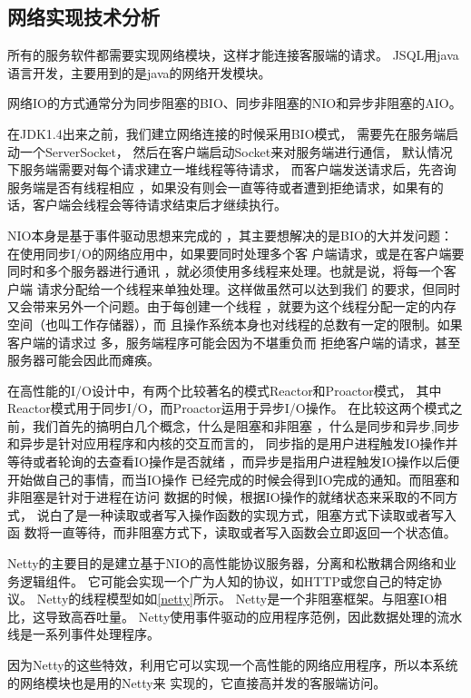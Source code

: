 \subsection{网络实现技术分析}
所有的服务软件都需要实现网络模块，这样才能连接客服端的请求。
JSQL用java语言开发，主要用到的是java的网络开发模块。

网络IO的方式通常分为同步阻塞的BIO、同步非阻塞的NIO和异步非阻塞的AIO。

在JDK1.4出来之前，我们建立网络连接的时候采用BIO模式，
需要先在服务端启动一个ServerSocket，
然后在客户端启动Socket来对服务端进行通信，
默认情况下服务端需要对每个请求建立一堆线程等待请求，
而客户端发送请求后，先咨询服务端是否有线程相应
，如果没有则会一直等待或者遭到拒绝请求，如果有的话，客户端会线程会等待请求结束后才继续执行。

NIO本身是基于事件驱动思想来完成的
，其主要想解决的是BIO的大并发问题：
 在使用同步I/O的网络应用中，如果要同时处理多个客
 户端请求，或是在客户端要同时和多个服务器进行通讯
 ，就必须使用多线程来处理。也就是说，将每一个客户端
 请求分配给一个线程来单独处理。这样做虽然可以达到我们
 的要求，但同时又会带来另外一个问题。由于每创建一个线程
 ，就要为这个线程分配一定的内存空间（也叫工作存储器），而
 且操作系统本身也对线程的总数有一定的限制。如果客户端的请求过
 多，服务端程序可能会因为不堪重负而
 拒绝客户端的请求，甚至服务器可能会因此而瘫痪。

在高性能的I/O设计中，有两个比较著名的模式Reactor和Proactor模式，
其中Reactor模式用于同步I/O，而Proactor运用于异步I/O操作。
在比较这两个模式之前，我们首先的搞明白几个概念，什么是阻塞和非阻塞
，什么是同步和异步,同步和异步是针对应用程序和内核的交互而言的，
同步指的是用户进程触发IO操作并等待或者轮询的去查看IO操作是否就绪
，而异步是指用户进程触发IO操作以后便开始做自己的事情，而当IO操作
已经完成的时候会得到IO完成的通知。而阻塞和非阻塞是针对于进程在访问
数据的时候，根据IO操作的就绪状态来采取的不同方式，
说白了是一种读取或者写入操作函数的实现方式，阻塞方式下读取或者写入函
数将一直等待，而非阻塞方式下，读取或者写入函数会立即返回一个状态值。

Netty的主要目的是建立基于NIO的高性能协议服务器，分离和松散耦合网络和业务逻辑组件。
它可能会实现一个广为人知的协议，如HTTP或您自己的特定协议。
Netty的线程模型如如\ref{netty}所示。
Netty是一个非阻塞框架。与阻塞IO相比，这导致高吞吐量。
Netty使用事件驱动的应用程序范例，因此数据处理的流水线是一系列事件处理程序。

因为Netty的这些特效，利用它可以实现一个高性能的网络应用程序，所以本系统的网络模块也是用的Netty来
实现的，它直接高并发的客服端访问。

